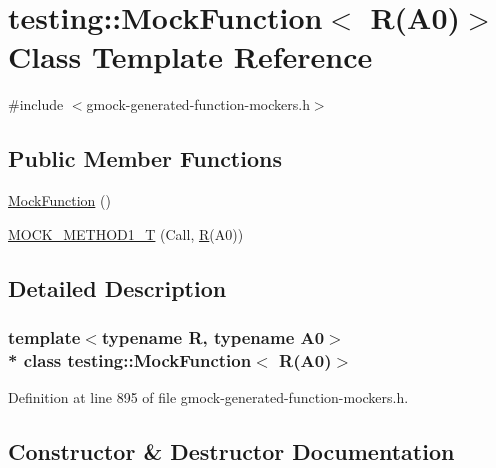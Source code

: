 \hypertarget{classtesting_1_1_mock_function_3_01_r_07_a0_08_4}{}\section{testing\+:\+:Mock\+Function$<$ R(A0)$>$ Class Template Reference}
\label{classtesting_1_1_mock_function_3_01_r_07_a0_08_4}


{\ttfamily \#include $<$gmock-\/generated-\/function-\/mockers.\+h$>$}

\subsection*{Public Member Functions}
\begin{DoxyCompactItemize}
\item 
\hyperlink{classtesting_1_1_mock_function_3_01_r_07_a0_08_4_a716abd3e67561edb8e431ffa55c4835d}{Mock\+Function} ()
\item 
\hyperlink{classtesting_1_1_mock_function_3_01_r_07_a0_08_4_a6a22e7e14b53d2df30bef4404b41fade}{M\+O\+C\+K\+\_\+\+M\+E\+T\+H\+O\+D1\+\_\+T} (Call, \hyperlink{typedefs__9_8js_afb423b73ee7b6c04d2d54fc06e405404}{R}(A0))
\end{DoxyCompactItemize}


\subsection{Detailed Description}
\subsubsection*{template$<$typename R, typename A0$>$\\*
class testing\+::\+Mock\+Function$<$ R(\+A0)$>$}



Definition at line 895 of file gmock-\/generated-\/function-\/mockers.\+h.



\subsection{Constructor \& Destructor Documentation}
